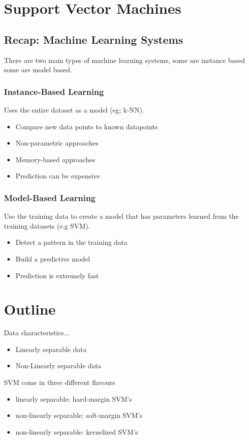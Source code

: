 \documentclass{article}
\begin{document}
\section{Support Vector Machines}
\subsection{Recap: Machine Learning Systems}
There are two main types of machine learning systems, some are instance based some are model based.

\subsubsection{Instance-Based Learning}
Uses the entire dataset as a model (eg; k-NN).
\begin{itemize}
	\item Compare new data points to known datapoints
	\item Non-parametric approaches
	\item Memory-based approaches
	\item Prediction can be expensive
\end{itemize}


\subsubsection{Model-Based Learning}
Use the training data to create a model that has parameters learned from the training datasets (e.g SVM).
\begin{itemize}
	\item Detect a pattern in the training data
	\item Build a predictive model
	\item Prediction is extremely fast
\end{itemize}

\section{Outline}
Data characteristics...
\begin{itemize}
	\item Linearly separable data
	\item Non-Linearly separable data
\end{itemize}

SVM come in three different flavours
\begin{itemize}
	\item linearly separable: hard-margin SVM's
	\item non-linearly separable: soft-margin SVM's
	\item non-linearly separable: kernelized SVM's
\end{itemize}
\end{document}
